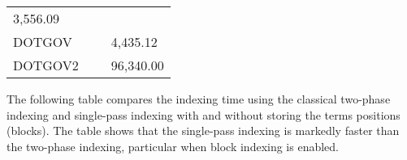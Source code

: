 \begin{longtable}[]{@{}lll@{}}
\begin{minipage}[t]{0.30\columnwidth}
3,556.09
\strut\end{minipage}\tabularnewline
\begin{minipage}[t]{0.30\columnwidth}\raggedright\strut
DOTGOV
\strut\end{minipage} &
\begin{minipage}[t]{0.30\columnwidth}\raggedright\strut
~
\strut\end{minipage} &
\begin{minipage}[t]{0.30\columnwidth}\raggedright\strut
4,435.12
\strut\end{minipage}\tabularnewline
\begin{minipage}[t]{0.30\columnwidth}\raggedright\strut
DOTGOV2
\strut\end{minipage} &
\begin{minipage}[t]{0.30\columnwidth}\raggedright\strut
~
\strut\end{minipage} &
\begin{minipage}[t]{0.30\columnwidth}\raggedright\strut
96,340.00
\strut\end{minipage}\tabularnewline
\bottomrule
\end{longtable}

The following table compares the indexing time using the classical
two-phase indexing and single-pass indexing with and without storing the
terms positions (blocks). The table shows that the single-pass indexing
is markedly faster than the two-phase indexing, particular when block
indexing is enabled.

